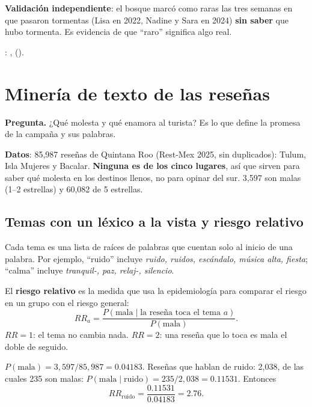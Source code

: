 \textbf{Validación independiente}: el bosque marcó como raras las tres semanas en que pasaron tormentas (Lisa en 2022,
Nadine y Sara en 2024) \textbf{sin saber} que hubo tormenta. Es evidencia de que ``raro'' significa algo real.

\begin{codigoen}: , 
().\end{codigoen}

\section{Minería de texto de las reseñas}
\label{sec:texto}
\textbf{Pregunta.} ¿Qué molesta y qué enamora al turista? Es lo que define la promesa de la campaña y sus palabras.

\textbf{Datos}: 85,987 reseñas de Quintana Roo (Rest-Mex 2025, sin duplicados): Tulum, Isla Mujeres y Bacalar.
\textbf{Ninguna es de los cinco lugares}, así que sirven para saber qué molesta en los destinos llenos, no para opinar
del sur. 3,597 son malas (1–2 estrellas) y 60,082 de 5 estrellas.

\subsection{Temas con un léxico a la vista y riesgo relativo}
Cada tema es una lista de raíces de palabras que cuentan solo al inicio de una palabra. Por ejemplo, ``ruido'' incluye
\emph{ruido, ruidos, escándalo, música alta, fiesta}; ``calma'' incluye \emph{tranquil-, paz, relaj-, silencio}.

El \textbf{riesgo relativo} es la medida que usa la epidemiología para comparar el riesgo en un grupo con el riesgo
general:
\[
RR_a=\frac{P(\text{mala}\mid\text{la reseña toca el tema }a)}{P(\text{mala})}.
\]
$RR=1$: el tema no cambia nada. $RR=2$: una reseña que lo toca es mala el doble de seguido.

\begin{amano}[ · ruido]
$P(\text{mala})=3{,}597/85{,}987=0.04183$. Reseñas que hablan de ruido: 2,038, de las cuales 235 son malas:
$P(\text{mala}\mid\text{ruido})=235/2{,}038=0.11531$. Entonces
\[RR_{\text{ruido}}=\frac{0.11531}{0.04183}=2.76 .\]
\end{amano}


